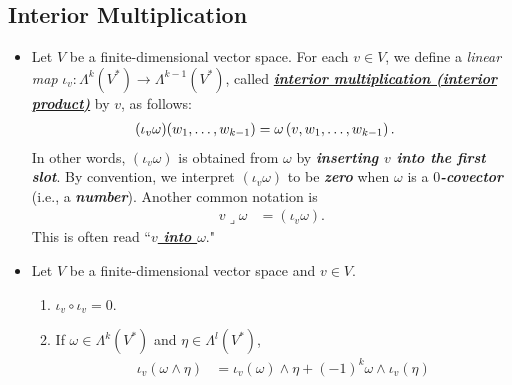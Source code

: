 \documentclass[11pt]{article}
\begin{document}
\subsection{Interior Multiplication}
\begin{itemize}
\item \begin{definition}
Let $V$ be a finite-dimensional vector space. For each $v \in V$, we define a \emph{linear map} $\iota_v: \Lambda^k(V^{*}) \rightarrow \Lambda^{k-1}(V^{*})$, called \underline{\emph{\textbf{interior multiplication (interior product)}}} by $v$, as follows:
\begin{align*}
(\iota_v\omega)(w_1,\ldots, w_{k-1}) &= \omega\left(v, w_1,\ldots, w_{k-1}\right).
\end{align*} In other words, $(\iota_v\omega)$ is obtained from $\omega$ by \emph{\textbf{inserting $v$ into the first slot}}.  By convention, we interpret $(\iota_v\omega)$ to be \emph{\textbf{zero}} when $\omega$ is a \emph{\textbf{$0$-covector}} (i.e., a \emph{\textbf{number}}). Another common notation is
\begin{align*}
v \mathbin{\lrcorner } \omega &= (\iota_v\omega).
\end{align*}
This is often read ``\underline{\emph{\textbf{$v$ into $\omega$}}}."
\end{definition}

\item \begin{proposition}
Let $V$ be a finite-dimensional vector space and $v \in V$.
\begin{enumerate}
\item $ \iota_v \circ \iota_v = 0$.
\item If $\omega \in \Lambda^k(V^{*})$ and $\eta \in \Lambda^l(V^{*})$,
\begin{align}
\iota_v(\omega \wedge \eta) &= \iota_{v}(\omega) \wedge \eta + (-1)^{k}\omega \wedge \iota_v(\eta)  \label{eqn: interior_product_property}
\end{align}
\end{enumerate}
\end{proposition}


\end{itemize}
\end{document}
